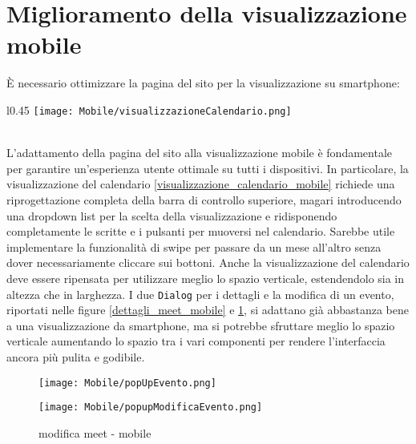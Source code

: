 \section{Miglioramento della visualizzazione mobile}
È necessario ottimizzare la pagina del sito per la visualizzazione su smartphone:
\begin{wrapfigure}{l}{0.45\textwidth}
    \centering
    \texttt{[image: Mobile/visualizzazioneCalendario.png]} 
    \caption{visualizzazione calendario - mobile}
    \label{visualizzazione_calendario_mobile}
\end{wrapfigure}
\\
L'adattamento della pagina del sito alla visualizzazione mobile è fondamentale per garantire un'esperienza 
utente ottimale su tutti i dispositivi. In particolare, la visualizzazione del calendario \ref{visualizzazione_calendario_mobile} richiede una 
riprogettazione completa della barra di controllo superiore, magari introducendo una dropdown list per 
la scelta della visualizzazione e ridisponendo completamente le scritte e i pulsanti per muoversi nel calendario. 
Sarebbe utile implementare la funzionalità di swipe per passare da un mese all'altro senza dover necessariamente 
cliccare sui bottoni. Anche la visualizzazione del calendario deve essere ripensata per utilizzare meglio lo spazio verticale, 
estendendolo sia in altezza che in larghezza.
\clearpage
\noindent I due \texttt{Dialog} per i dettagli e la modifica di un evento, riportati nelle figure 
\ref{dettagli_meet_mobile} e \ref{modifica_meet_mobile},
si adattano già abbastanza bene a una 
visualizzazione da smartphone, ma si potrebbe sfruttare meglio lo spazio verticale aumentando lo spazio tra i vari 
componenti per rendere l'interfaccia ancora più pulita e godibile. 
\begin{figure}[H]
    \centering
    \begin{minipage}{0.45\textwidth}
        \centering
        \texttt{[image: Mobile/popUpEvento.png]}
        \caption{dettagli meet - mobile}
        \label{dettagli_meet_mobile}
    \end{minipage}
    \hspace{0.05\textwidth}
    \begin{minipage}{0.45\textwidth}
        \centering
        \texttt{[image: Mobile/popupModificaEvento.png]}
        \caption{modifica meet - mobile}
        \label{modifica_meet_mobile}
    \end{minipage}
\end{figure}
